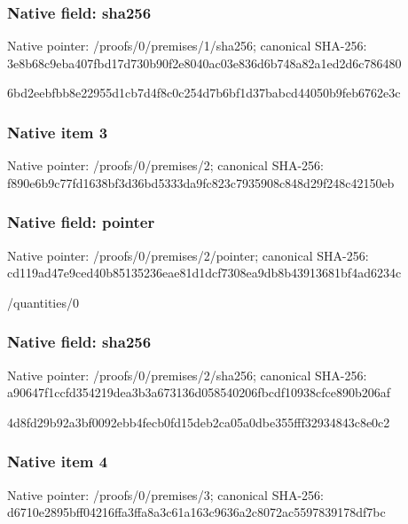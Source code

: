 \documentclass[10pt,a4paper]{article}
\begin{document}
\subsubsection{Native field: sha256}


Native pointer: /proofs/0/premises/1/sha256; canonical SHA-256: 3e8b68c9eba407fbd17d730b\allowbreak{}90f2e8040ac03e836d6b748a\allowbreak{}82a1ed2d6c786480


6bd2eebfbb8e22955d1cb7d4\allowbreak{}f8c0c254d7b6bf1d37babcd4\allowbreak{}4050b9feb6762e3c


\subsubsection{Native item 3}


Native pointer: /proofs/0/premises/2; canonical SHA-256: f890e6b9c77fd1638bf3d36b\allowbreak{}d5333da9fc823c7935908c84\allowbreak{}8d29f248c42150eb



\subsubsection{Native field: pointer}


Native pointer: /proofs/0/premises/2/pointer; canonical SHA-256: cd119ad47e9ced40b8513523\allowbreak{}6eae81d1dcf7308ea9db8b43\allowbreak{}913681bf4ad6234c


/quantities/0


\subsubsection{Native field: sha256}


Native pointer: /proofs/0/premises/2/sha256; canonical SHA-256: a90647f1ccfd354219dea3b3\allowbreak{}a673136d058540206fbcdf10\allowbreak{}938cfce890b206af


4d8fd29b92a3bf0092ebb4fe\allowbreak{}cb0fd15deb2ca05a0dbe355f\allowbreak{}ff32934843c8e0c2


\subsubsection{Native item 4}


Native pointer: /proofs/0/premises/3; canonical SHA-256: d6710e2895bff04216ffa3ff\allowbreak{}a8a3c61a163c9636a2c8072a\allowbreak{}c5597839178df7bc
\end{document}

